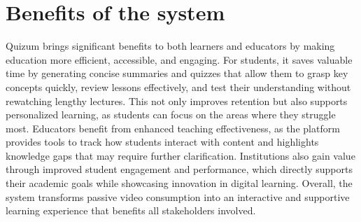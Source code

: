 \section{Benefits of the system}
Quizum brings significant benefits to both learners and educators by making education more efficient, accessible, and engaging. For students, it saves valuable time by generating concise summaries and quizzes that allow them to grasp key concepts quickly, review lessons effectively, and test their understanding without rewatching lengthy lectures. This not only improves retention but also supports personalized learning, as students can focus on the areas where they struggle most. Educators benefit from enhanced teaching effectiveness, as the platform provides tools to track how students interact with content and highlights knowledge gaps that may require further clarification. Institutions also gain value through improved student engagement and performance, which directly supports their academic goals while showcasing innovation in digital learning. Overall, the system transforms passive video consumption into an interactive and supportive learning experience that benefits all stakeholders involved.
